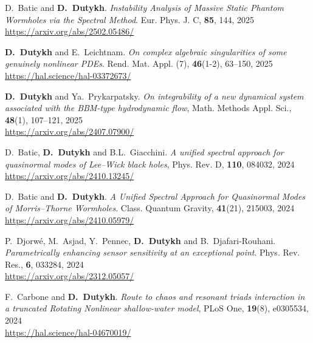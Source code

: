 \documentclass[final, a4paper, oneside, 12pt]{article}
\numberwithin{equation}{section}
\begin{document}
\begin{etaremune}
  \item D.~Batic and \textbf{D.~Dutykh}. \textit{Instability Analysis of Massive Static Phantom Wormholes via the Spectral Method}. Eur. Phys. J. C, \textbf{85}, 144, 2025 \\ %
  \url{https://arxiv.org/abs/2502.05486/}

  \item \textbf{D.~Dutykh} and E.~Leichtnam. \textit{On complex algebraic singularities of some genuinely nonlinear PDEs}. Rend. Mat. Appl. (7), \textbf{46}(1-2), 63--150, 2025 \\ %
  \url{https://hal.science/hal-03372673/}

  \item \textbf{D.~Dutykh} and Ya.~Prykarpatsky. \textit{On integrability of a new dynamical system associated with the BBM-type hydrodynamic flow}, Math. Methods Appl. Sci., \textbf{48}(1), 107--121, 2025 \\ %
  \url{https://arxiv.org/abs/2407.07900/}



  \item D.~Batic, \textbf{D.~Dutykh} and B.L.~Giacchini. \textit{A unified spectral approach for quasinormal modes of Lee--Wick black holes}, Phys. Rev. D, \textbf{110}, 084032, 2024 \\ %
  \url{https://arxiv.org/abs/2410.13245/}

  \item D.~Batic and \textbf{D.~Dutykh}. \textit{A Unified Spectral Approach for Quasinormal Modes of Morris--Thorne Wormholes}. Class. Quantum Gravity, \textbf{41}(21), 215003, 2024 \\ %
  \url{https://arxiv.org/abs/2410.05979/}

  \item P.~Djorw\'e, M.~Asjad, Y.~Pennec, \textbf{D.~Dutykh} and B.~Djafari-Rouhani. \textit{Parametrically enhancing sensor sensitivity at an exceptional point}. Phys. Rev. Res., \textbf{6}, 033284, 2024 \\ %
  \url{https://arxiv.org/abs/2312.05057/}
  
  \item F.~Carbone and \textbf{D.~Dutykh}. \textit{Route to chaos and resonant triads interaction in a truncated Rotating Nonlinear shallow-water model}, PLoS One, \textbf{19}(8), e0305534, 2024 \\ %
  \url{https://hal.science/hal-04670019/}


\end{etaremune}
\end{document}
